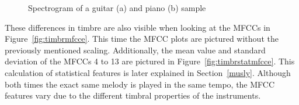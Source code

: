 \begin{figure}[htbp]
	\centering
	\caption{Spectrogram of a guitar (a) and piano (b) sample}	
	\label{fig:timbre}
\end{figure}
\FloatBarrier
\noindent These differences in timbre are also visible when looking at the MFCCs in Figure~\ref{fig:timbrmfcce}. This time the MFCC plots are pictured without the previously mentioned scaling. Additionally, the mean value and standard deviation of the MFCCs 4 to 13 are pictured in Figure~\ref{fig:timbrstatmfcce}. This calculation of statistical features is later explained in Section~\ref{musly}. Although both times the exact same melody is played in the same tempo, the MFCC features vary due to the different timbral properties of the instruments. 
